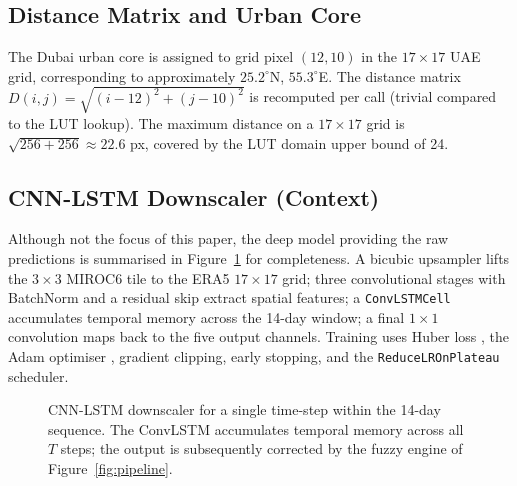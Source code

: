 \documentclass[conference]{IEEEtran}
\begin{document}
\subsection{Distance Matrix and Urban Core}

The Dubai urban core is assigned to grid pixel \((12,10)\) in the
\(17\times 17\) UAE grid, corresponding to approximately
\(25.2^{\circ}\)N, \(55.3^{\circ}\)E.  The distance matrix
\(D(i,j)=\sqrt{(i-12)^2+(j-10)^2}\) is recomputed per call
(trivial compared to the LUT lookup).  The maximum distance on a
\(17\times 17\) grid is \(\sqrt{256+256}\approx 22.6\) px, covered by the
LUT domain upper bound of 24.

\subsection{CNN-LSTM Downscaler (Context)}

Although not the focus of this paper, the deep model providing the raw
predictions is summarised in Figure~\ref{fig:cnnlstm} for completeness.
A bicubic upsampler lifts the \(3\times 3\) MIROC6 tile to the ERA5
\(17\times 17\) grid; three convolutional stages with BatchNorm and a
residual skip extract spatial features; a \texttt{ConvLSTMCell}
\cite{shi2015convolutional} accumulates temporal memory across the
14-day window; a final \(1\times 1\) convolution maps back to the five
output channels.  Training uses Huber loss \cite{huber1964robust}, the
Adam optimiser \cite{kingma2015adam}, gradient clipping, early
stopping, and the \texttt{ReduceLROnPlateau} scheduler.

\begin{figure}[!t]
\centering
{}
\caption{CNN-LSTM downscaler for a single time-step within the 14-day
sequence.  The ConvLSTM accumulates temporal memory across all \(T\)
steps; the output is subsequently corrected by the fuzzy engine of
Figure~\ref{fig:pipeline}.}
\label{fig:cnnlstm}
\end{figure}
\end{document}
